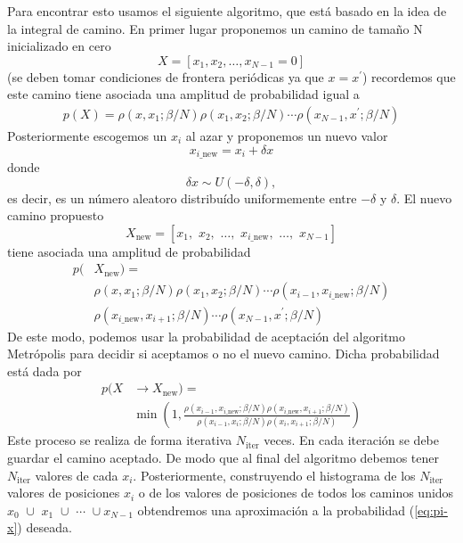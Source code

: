 \documentclass[%
 reprint,
 amsmath,amssymb,
 aps,
 pra,
]{revtex4-2}
\begin{document}
Para encontrar esto usamos el siguiente algoritmo, que está basado en la idea de la integral de camino. En primer lugar proponemos un camino de tamaño N inicializado en cero
\begin{equation}
	X = [x_1, x_2, \dots, x_{N-1} = 0] \label{eq:path-ini}
\end{equation}
(se deben tomar condiciones de frontera periódicas ya que $x = x^\prime$) recordemos que este camino tiene asociada una amplitud de probabilidad igual a  
\begin{align}
	p(X) = \rho (x,x_1; \beta/N) \rho (x_1,x_2; \beta/N) \cdots \rho (x_{N-1},x^{\prime}; \beta/N)
\end{align}
Posteriormente escogemos un $x_i$ al azar y proponemos un nuevo valor
\begin{equation}
	x_{i\_\mathrm{new}} = x_i + \delta x
\end{equation}
donde
\begin{equation}
	\delta x \sim U(-\delta,\delta),
\end{equation}
es decir, es un número aleatoro distribuído uniformemente entre $-\delta$ y $\delta$. El nuevo camino propuesto
\begin{equation}
	X_\mathrm{new}=[x_1,\,\,x_2,\,\,\dots,\,\,x_{i\_\mathrm{new}},\,\,\dots,\,\,x_{N-1}]	
\end{equation}
tiene asociada una amplitud de probabilidad 
\begin{align}
	p(&X_\mathrm{new}) = \nonumber \\
	&\rho (x,x_1; \beta/N) \rho (x_1,x_2; \beta/N) \cdots \rho (x_{i-1},x_{i\_\mathrm{new}}; \beta/N) \nonumber \\
	&\rho (x_{i\_\mathrm{new}},x_{i+1}; \beta/N) \cdots \rho (x_{N-1},x^{\prime}; \beta/N)
\end{align}
De este modo, podemos usar la probabilidad de aceptación del algoritmo Metrópolis para decidir si aceptamos o no el nuevo camino. Dicha probabilidad está dada por
\begin{align}
p(X & \rightarrow  X_\mathrm{new}) = \nonumber \\
&\min\left(1,\frac{\rho (x_{i-1},x_{i\_\mathrm{new}}; \beta/N) \rho (x_{i\_\mathrm{new}},x_{i+1}; \beta/N) }{\rho (x_{i-1},x_i; \beta/N) \rho (x_i,x_{i+1}; \beta/N)}\right) \label{eq:acceptance-prob-path}
\end{align} 
Este proceso se realiza de forma iterativa $N_\mathrm{iter}$ veces.
En cada iteración se debe guardar el camino aceptado. De modo que al final del algoritmo debemos tener $N_\mathrm{iter}$ valores de cada $x_i$. Posteriormente, construyendo el histograma de los $N_\mathrm{iter}$ valores de posiciones $x_i$ o de los valores de posiciones de todos los caminos unidos $x_0\,\, \cup \,\, x_1 \,\, \cup \,\, \cdots \,\, \cup x_{N-1}$  obtendremos una aproximación a la probabilidad (\ref{eq:pi-x}) deseada. 
\end{document}
